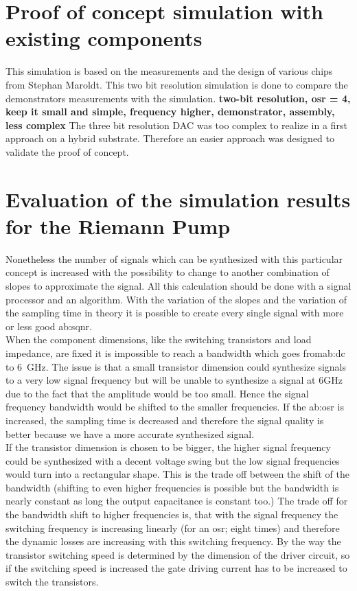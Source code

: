 \section{Proof of concept simulation with existing components}
\label{ch:ProofOfConceptWithExistingComponents}
This simulation is based on the measurements and the design of various chips from Stephan Maroldt.
This two bit resolution simulation is done to compare the demonstrators measurements with the simulation. \textbf{two-bit resolution, osr = 4, keep it small and simple, frequency higher, demonstrator, assembly, less complex} 
The three bit resolution DAC was too complex to realize in a first approach on a hybrid substrate. Therefore an easier approach was designed to validate the proof of concept.

\section{Evaluation of the simulation results for the Riemann Pump}
Nonetheless the number of signals which can be synthesized with this particular concept is increased with the possibility to change to another combination of slopes to approximate the signal.
All this calculation should be done with a signal processor and an algorithm.
With the variation of the slopes and the variation of the sampling time in theory it is possible to create every single signal with more or less good \gls{ab:sqnr}.
\\
When the component dimensions, like the switching transistors and load impedance, are fixed it is impossible to reach a bandwidth which goes from\gls{ab:dc} to \SI{6}{\GHz}.
The issue is that a small transistor dimension could synthesize signals to a very low signal frequency but will be unable to synthesize a signal at 6GHz due to the fact that the amplitude would be too small.
Hence the signal frequency bandwidth would be shifted to the smaller frequencies. 
If the \gls{ab:osr} is increased, the sampling time is decreased and therefore the signal quality is better because we have a more accurate synthesized signal. \\
If the transistor dimension is chosen to be bigger, the higher signal frequency could be synthesized with a decent voltage swing but the low signal frequencies would turn into a rectangular shape. 
This is the trade off between the shift of the bandwidth (shifting to even higher frequencies is possible but the bandwidth is nearly constant as long the output capacitance is constant too.) The trade off for the bandwidth shift to higher frequencies is, that with the signal frequency the switching frequency is increasing linearly (for an osr; eight times) and therefore the dynamic losses are increasing with this switching frequency.
By the way the transistor switching speed is determined by the dimension of the driver circuit, so if the switching speed is increased the gate driving current has to be increased to switch the transistors.

